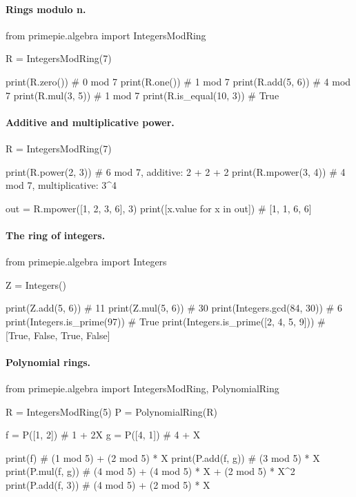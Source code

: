 \paragraph{Rings modulo n.}
\begin{pybox}
from primepie.algebra import IntegersModRing

R = IntegersModRing(7)

print(R.zero())          # 0 mod 7
print(R.one())           # 1 mod 7
print(R.add(5, 6))       # 4 mod 7
print(R.mul(3, 5))       # 1 mod 7
print(R.is_equal(10, 3)) # True
\end{pybox}

\paragraph{Additive and multiplicative power.}
\begin{pybox}
R = IntegersModRing(7)

print(R.power(2, 3))     # 6 mod 7, additive: 2 + 2 + 2
print(R.mpower(3, 4))    # 4 mod 7, multiplicative: 3^4

out = R.mpower([1, 2, 3, 6], 3)
print([x.value for x in out])  # [1, 1, 6, 6]
\end{pybox}

\paragraph{The ring of integers.}
\begin{pybox}
from primepie.algebra import Integers

Z = Integers()

print(Z.add(5, 6))              # 11
print(Z.mul(5, 6))              # 30
print(Integers.gcd(84, 30))     # 6
print(Integers.is_prime(97))    # True
print(Integers.is_prime([2, 4, 5, 9]))
# [True, False, True, False]
\end{pybox}

\paragraph{Polynomial rings.}
\begin{pybox}
from primepie.algebra import IntegersModRing, PolynomialRing

R = IntegersModRing(5)
P = PolynomialRing(R)

f = P([1, 2])   # 1 + 2X
g = P([4, 1])   # 4 + X

print(f)            # (1 mod 5) + (2 mod 5) * X
print(P.add(f, g))  # (3 mod 5) * X
print(P.mul(f, g))  # (4 mod 5) + (4 mod 5) * X + (2 mod 5) * X^2
print(P.add(f, 3))  # (4 mod 5) + (2 mod 5) * X
\end{pybox}
